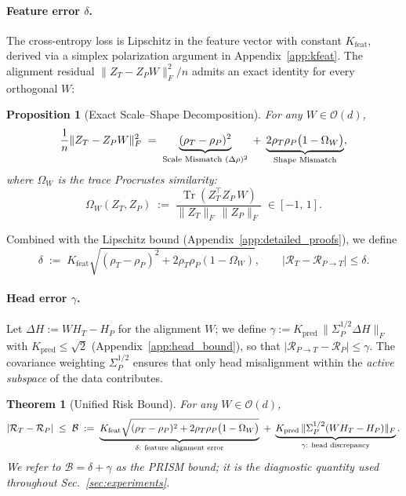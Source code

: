 \documentclass{article}
\newtheorem{theorem}{Theorem}
\newtheorem{proposition}{Proposition}
\begin{document}
\paragraph{Feature error $\delta$.}
The cross-entropy loss is Lipschitz in the feature vector with constant $K_{\mathrm{feat}}$, derived via a simplex polarization argument in Appendix~\ref{app:kfeat}. The alignment residual $\|Z_T - Z_P W\|_F^2 / n$ admits an exact identity for every orthogonal $W$:

\begin{proposition}[Exact Scale--Shape Decomposition]
\label{prop:exact_decomposition}
For any $W \in \mathcal{O}(d)$,
\begin{equation}
\label{eq:exact_equality}
\frac{1}{n} \| Z_T - Z_P W \|_F^2
\;=\;
\underbrace{(\rho_T - \rho_P)^2}_{\text{\rm Scale Mismatch } (\Delta\rho)^2}
\;+\;
\underbrace{2 \rho_T \rho_P \big( 1 - \Omega_W \big)}_{\text{\rm Shape Mismatch}},
\end{equation}
where $\Omega_W$ is the \emph{trace Procrustes similarity}:
\begin{equation}
\label{eq:omega_def}
\Omega_W(Z_T, Z_P) \;:=\; \frac{\operatorname{Tr}(Z_T^\top Z_P\, W)}{\| Z_T \|_F\, \| Z_P \|_F} \;\in [-1,\, 1].
\end{equation}
\end{proposition}

Combined with the Lipschitz bound (Appendix~\ref{app:detailed_proofs}), we define
\begin{equation}
\label{eq:delta_bound}
\delta \;:=\; K_{\mathrm{feat}} \sqrt{(\rho_T - \rho_P)^2 + 2\rho_T \rho_P (1 - \Omega_W)}, \qquad |\mathcal{R}_T - \mathcal{R}_{P\to T}| \le \delta.
\end{equation}

\paragraph{Head error $\gamma$.}
Let $\Delta H := W H_T - H_P$ for the alignment $W$; we define $\gamma := K_{\mathrm{pred}}\,\|\Sigma_P^{1/2}\Delta H\|_F$ with $K_{\mathrm{pred}} \le \sqrt{2}$ (Appendix~\ref{app:head_bound}), so that $|\mathcal{R}_{P\to T} - \mathcal{R}_P| \le \gamma$. The covariance weighting $\Sigma_P^{1/2}$ ensures that only head misalignment within the \emph{active subspace} of the data contributes.

\begin{theorem}[Unified Risk Bound]
\label{thm:unified_bound}
For any $W \in \mathcal{O}(d)$,
\begin{equation}
\label{eq:unified_bound}
|\mathcal{R}_T - \mathcal{R}_P| \;\le\; \mathcal{B} \;:=\; \underbrace{K_{\mathrm{feat}} \sqrt{ (\rho_T - \rho_P)^2 + 2\rho_T \rho_P \big(1 - \Omega_W\big) }}_{\delta:\ \text{\rm feature alignment error}} \;+\; \underbrace{K_{\mathrm{pred}} \,\| \Sigma_P^{1/2} (W H_T - H_P) \|_F}_{\gamma:\ \text{\rm head discrepancy}}.
\end{equation}
We refer to $\mathcal{B} = \delta + \gamma$ as the \emph{PRISM bound}; it is the diagnostic quantity used throughout Sec.~\ref{sec:experiments}.
\end{theorem}
\end{document}
